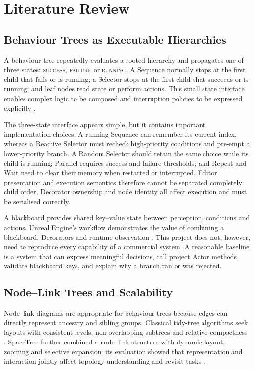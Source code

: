 \chapter{Literature Review}
\label{ch:literature}

\section{Behaviour Trees as Executable Hierarchies}

A behaviour tree repeatedly evaluates a rooted hierarchy and propagates one of three states: \textsc{success}, \textsc{failure} or \textsc{running}. A Sequence normally stops at the first child that fails or is running; a Selector stops at the first child that succeeds or is running; and leaf nodes read state or perform actions. This small state interface enables complex logic to be composed and interruption policies to be expressed explicitly \parencite{colledanchise2018bt}.

The three-state interface appears simple, but it contains important implementation choices. A running Sequence can remember its current index, whereas a Reactive Selector must recheck high-priority conditions and pre-empt a lower-priority branch. A Random Selector should retain the same choice while its child is running; Parallel requires success and failure thresholds; and Repeat and Wait need to clear their memory when restarted or interrupted. Editor presentation and execution semantics therefore cannot be separated completely: child order, Decorator ownership and node identity all affect execution and must be serialised correctly.

A blackboard provides shared key--value state between perception, conditions and actions. Unreal Engine's workflow demonstrates the value of combining a blackboard, Decorators and runtime observation \parencite{unrealbt}. This project does not, however, need to reproduce every capability of a commercial system. A reasonable baseline is a system that can express meaningful decisions, call project Actor methods, validate blackboard keys, and explain why a branch ran or was rejected.

\section{Node--Link Trees and Scalability}

Node--link diagrams are appropriate for behaviour trees because edges can directly represent ancestry and sibling groups. Classical tidy-tree algorithms seek layouts with consistent levels, non-overlapping subtrees and relative compactness \parencite{reingold1981tidier}. SpaceTree further combined a node--link structure with dynamic layout, zooming and selective expansion; its evaluation showed that representation and interaction jointly affect topology-understanding and revisit tasks \parencite{plaisant2002spacetree}.

